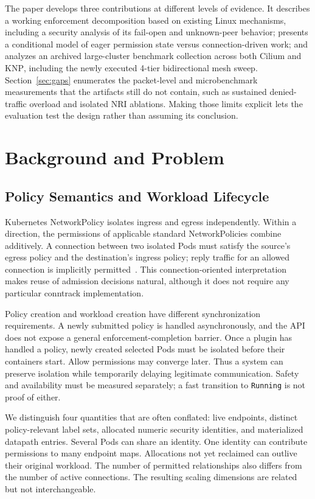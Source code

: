 \documentclass[letterpaper,twocolumn,10pt]{article}
\newcommand{\sys}{\textsc{KNP}}
\begin{document}
The paper develops three contributions at different levels of evidence.
It describes a working enforcement decomposition based on existing Linux
mechanisms, including a security analysis of its fail-open and
unknown-peer behavior; presents a conditional model of eager permission
state versus connection-driven work; and analyzes an archived
large-cluster benchmark collection across both Cilium and \sys{}, including
the newly executed 4-tier bidirectional mesh sweep. Section~\ref{sec:gaps}
enumerates the packet-level and microbenchmark measurements that the
artifacts still do not contain, such as sustained denied-traffic overload
and isolated NRI ablations. Making those limits explicit lets the
evaluation test the design rather than assuming its conclusion.

\section{Background and Problem}
\label{sec:background}
\subsection{Policy Semantics and Workload Lifecycle}
Kubernetes NetworkPolicy isolates ingress and egress independently. Within
a direction, the permissions of applicable standard NetworkPolicies combine
additively. A connection between two isolated Pods must satisfy the source's
egress policy and the destination's ingress policy; reply traffic for an
allowed connection is implicitly permitted~\cite{k8snetworkpolicy}. This
connection-oriented interpretation makes reuse of admission decisions
natural, although it does not require any particular conntrack implementation.

Policy creation and workload creation have different synchronization
requirements. A newly submitted policy is handled asynchronously, and the
API does not expose a general enforcement-completion barrier. Once a plugin
has handled a policy, newly created selected Pods must be isolated before
their containers start. Allow permissions may converge later. Thus a system
can preserve isolation while temporarily delaying legitimate communication.
Safety and availability must be measured separately; a fast transition to
\texttt{Running} is not proof of either.

We distinguish four quantities that are often conflated: live endpoints,
distinct policy-relevant label sets, allocated numeric security identities,
and materialized datapath entries. Several Pods can share an identity.
One identity can contribute permissions to many endpoint maps. Allocations
not yet reclaimed can outlive their original workload. The number of
permitted relationships also differs from the number of active connections.
The resulting scaling dimensions are related but not interchangeable.
\end{document}
